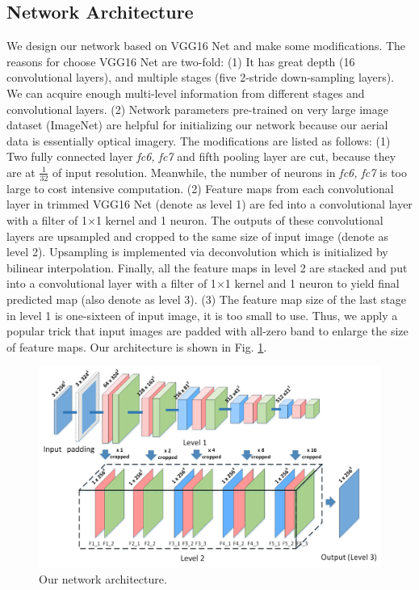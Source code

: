 \documentclass[runningheads]{llncs}
\begin{document}
\subsection{Network Architecture} 
   We design our network based on VGG16 Net \cite{Simonyan2014Very} and make some modifications. The reasons for choose VGG16 Net are two-fold: (1) It has great depth (16 convolutional layers), and multiple stages (five 2-stride down-sampling layers). We can acquire enough multi-level information from different stages and convolutional layers. (2) Network parameters pre-trained on very large image dataset (ImageNet) are helpful for initializing our network  because our aerial data is essentially optical imagery.  The modifications are listed as follows: (1) Two fully connected layer \textit{fc6, fc7} and fifth pooling layer are cut, because they are at $\frac{1}{32}$ of input resolution. Meanwhile, the number of neurons in \textit{fc6, fc7} is too large to cost intensive computation. (2) Feature maps from each convolutional layer in trimmed VGG16 Net (denote as level 1) are fed into a convolutional layer with a filter of 1$\times$1 kernel and 1 neuron. The outputs of these convolutional layers are upsampled and cropped to the same size of input image (denote as level 2). Upsampling is implemented via deconvolution which is initialized by bilinear interpolation.  Finally, all the  feature maps in level 2 are stacked and put into a convolutional layer with a filter of 1$\times$1 kernel and 1 neuron to yield final predicted map (also denote as level 3). (3) The  feature map size of the last stage in level 1 is one-sixteen of input image, it is too small to use. Thus, we apply a popular trick that  input images are padded with all-zero band to enlarge the size of feature maps. Our architecture is shown in Fig. \ref{fig:hierarchicalFCN}.
 
\begin{figure}
\centering
\includegraphics[width=120mm]{hierarchicalFCN5}
\caption{Our network architecture.}
\label{fig:hierarchicalFCN}
\end{figure}
\end{document}
